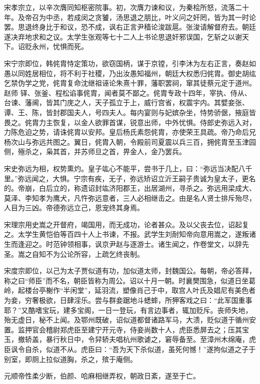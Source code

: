 \documentclass[a4paper,12pt,UTF8,twoside]{ctexbook}
\begin{document}
    宋孝宗立，以辛次膺同知枢密院事。初，次膺力谏和议，为秦桧所怒，流落二十年。及帝召为中丞，若成闵之贪饕，汤思退之朋比，叶义问之奸罔，皆为其一时论罢。思退终身比于和议，恐不成，讽右正言尹穑论浚跋扈。张浚请解督府去。朝廷遂决弃地求和之议。太学生张观等七十二人上书论思退奸邪误国，乞斩之以谢天下。诏贬永州，忧惧而死。
    
    宋宁宗即位，韩侂胄恃定策功，欲窃国柄，谋于京镗，引李沐为左右正言，奏赵如愚以同姓居相位，将不利于社稷，乃出汝愚知福州，朝廷大权悉归侂胄。御史胡纮乞禁伪学之党，侂胄复命沈继祖诬论朱熹十罪，藩职罢祠，窜其徒蔡元定于道州。赵师 铎、张釜、程松谄事侂胄，闻者莫不鄙之。侂胄专政十四年，宰执、侍从、台谏、藩阃，皆其门庑之人，天子孤立于上，威行宫省，权震宇内。其嬖妾张、谭、王、陈，皆封郡国夫人，号四夫人。每内宴则与妃嫔杂坐，恃势骄倨，掖庭皆畏之。侂胄力主恢复，以金人欲罪首谋，锐意出师，中外忧惧。侍郎史弥远入对，力陈危迫之势，请诛侂胄以安邦。皇后杨氏素怨侂胄，亦使荣王具疏。帝乃命后兄杨次山与弥远共图之。翼日，侂胄入朝，令殿前司夏震以兵三百，拥侂胄至玉津园侧，殛杀之，枭其首，并苏师旦之首，畀金人，金乃罢兵。
    
    宋史弥远为相，权势熏灼。皇子竑心不能平，尝书于几上，曰：“弥远当决配八千里。”弥远闻之，大惧。宁宗有疾，无子，弥远矫诏立沂王嗣子贵诚为皇太子，更名的。帝崩，白后立的，称遗诏封竑济阳郡王，出居湖州，寻杀之。弥远用梁成大、莫泽、李知孝为鹰犬，凡忤弥远意者，三人必相继击之。由是名人贤士排斥殆尽，人目为三凶。帝德弥远立己，恩宠终其身焉。
    
    宋理宗用史嵩之开督府，竭国用，而无成功，论者甚众。及以父丧去位，诏起复之。太学生黄恺伯等百四十人上书谏，不报。武学生刘耐知帝向意用嵩之，遂叛诸生而逢迎之。时范钟领相事，讽京尹赵与逐游士。诸生闻之，作卷堂文，以辞先圣。嵩之自知不为公论所容，上疏乞终丧制。
    
    宋度宗即位，以己为太子贾似道有功，加似道太师，封魏国公。每朝，帝必答拜，称之曰“师臣”而不名，朝臣皆称为周公。诏以十月一朝。时襄樊围急，似道日坐葛岭，起楼台亭榭作“半闲堂”，延羽流，塑像肖己于中，取宫人叶氏及娼尼有美色者为妾，穷奢极欲，日肆淫乐。尝与群妾踞地斗蟋蟀，所狎客戏之曰：“此军国重事耶？”又酷嗜宝玩，建多宝阁，一日一登玩，有言边事者，辄加贬斥。丧师失地，殆无虚日，秘不上闻。及鄂州既破，诏似道都督诸路军马，大溃，贬似道于循州安置。监押官会稽尉郑虎臣至建宁开元寺，侍妾尚数十人，虎臣悉屏去之；压其宝玉，撤轿盖，暴行秋日中，令舁轿夫唱杭州歌谑之，窘辱备至。至漳州木绵庵，虎臣讽令自杀，似道不从。虎臣曰：“吾为天下杀似道，虽死何憾！”遂拘似道之子于别室，即厕上拉似道胸，杀之，殡于庵侧。
    
    元顺帝性柔少断，伯颜、哈麻相继弄权，朝政日紊，遂至于亡。
    
\end{document}
